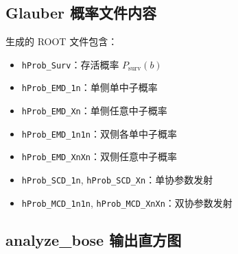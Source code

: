 \documentclass[11pt,a4paper,UTF8]{ctexart}
\begin{document}
\subsection{Glauber 概率文件内容}

生成的 ROOT 文件包含：
\begin{itemize}[leftmargin=2em]
    \item \texttt{hProb\_Surv}：存活概率 $P_{\text{surv}}(b)$
    \item \texttt{hProb\_EMD\_1n}：单侧单中子概率
    \item \texttt{hProb\_EMD\_Xn}：单侧任意中子概率
    \item \texttt{hProb\_EMD\_1n1n}：双侧各单中子概率
    \item \texttt{hProb\_EMD\_XnXn}：双侧任意中子概率
    \item \texttt{hProb\_SCD\_1n}, \texttt{hProb\_SCD\_Xn}：单协参数发射
    \item \texttt{hProb\_MCD\_1n1n}, \texttt{hProb\_MCD\_XnXn}：双协参数发射
\end{itemize}

\subsection{analyze\_bose 输出直方图}
\end{document}
